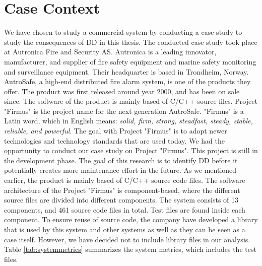 \section{Case Context}
\label{sec:casecontext}
We have chosen to study a commercial system by conducting a case study to study the consequences of DD in this thesis. The conducted case study took place at Autronica Fire and Security AS. Autronica is a leading innovator, manufacturer, and supplier of fire safety equipment and marine safety monitoring and surveillance equipment. Their headquarter is based in Trondheim, Norway. AutroSafe, a high-end distributed fire alarm system, is one of the products they offer. The product was first released around year 2000, and has been on sale since. The software of the product is mainly based of C/C++ source files. Project "Firmus" is the project name for the next generation AutroSafe. "Firmus" is a Latin word, which in English means: \textit{solid, firm, strong, steadfast, steady, stable, reliable, and powerful}. The goal with Project "Firmus" is to adopt newer technologies and technology standards that are used today. We had the opportunity to conduct our case study on Project "Firmus". This project is still in the development phase. The goal of this research is to identify DD before it potentially creates more maintenance effort in the future. As we mentioned earlier, the product is mainly based of C/C++ source code files. The software architecture of the Project "Firmus" is component-based, where the different source files are divided into different components. The system consists of 13 components, and 461 source code files in total. Test files are found inside each component. To ensure reuse of source code, the company have developed a library that is used by this system and other systems as well as they can be seen as a case itself. However, we have decided not to include library files in our analysis. Table \ref{tab:systemmetrics} summarizes the system metrics, which includes the test files.


